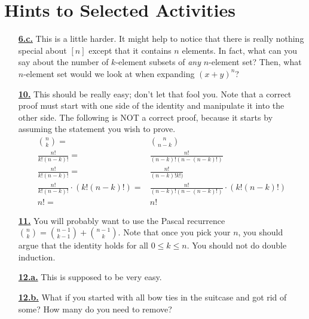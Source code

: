 \documentclass[10pt,]{book}
\theoremstyle{plain}
\theoremstyle{definition}
\theoremstyle{definition}
\theoremstyle{definition}
\numberwithin{equation}{chapter}
\newcommand{\amp}{&}
\begin{document}
\chapter[{Hints to Selected Activities}]{Hints to Selected Activities}\label{appendix-3}
\begin{itemize}[itemsep=1em]
\hypertarget{a-6.c}{}\item[\textbf{\hyperref[task-21]{6.c.}}]
\hypertarget{p-55}{}%
This is a little harder.  It might help to notice that there is really nothing special about \([n]\) except that it contains \(n\) elements.  In fact, what can you say about the number of \(k\)-element subsets of \emph{any} \(n\)-element set?  Then, what \(n\)-element set would we look at when expanding \((x+y)^n\)?%

\hypertarget{a-10}{}\item[\textbf{\hyperref[activity-10]{10.}}]
\hypertarget{p-98}{}%
This should be really easy; don't let that fool you.  Note that a correct proof must start with one side of the identity and manipulate it into the other side.  The following is NOT a correct proof, because it starts by assuming the statement you wish to prove.%
\begin{align*}
\binom{n}{k}  = \amp \binom{n}{n-k}\\
\frac{n!}{k!(n-k)!} =  \amp \frac{n!}{(n-k)!(n-(n-k)!)}\\
\frac{n!}{k!(n-k)!} =  \amp \frac{n!}{(n-k)!k!)}\\
\frac{n!}{k!(n-k)!} \cdot (k!(n-k)!)=  \amp \frac{n!}{(n-k)!(n-(n-k)!)}\cdot(k!(n-k)!)\\
n! =  \amp n!
\end{align*}
%

\hypertarget{a-11}{}\item[\textbf{\hyperref[activity-11]{11.}}]
\hypertarget{p-102}{}%
You will probably want to use the Pascal recurrence \(\binom{n}{k} = \binom{n-1}{k-1} + \binom{n-1}{k}\).  Note that once you pick your \(n\), you should argue that the identity holds for all \(0 \le k \le n\).  You should not do double induction.%

\hypertarget{a-12.a}{}\item[\textbf{\hyperref[task-33]{12.a.}}]
\hypertarget{p-107}{}%
This is supposed to be very easy.%

\hypertarget{a-12.b}{}\item[\textbf{\hyperref[task-34]{12.b.}}]
\hypertarget{p-110}{}%
What if you started with all bow ties in the suitcase and got rid of some?  How many do you need to remove?%


\end{itemize}
\end{document}
